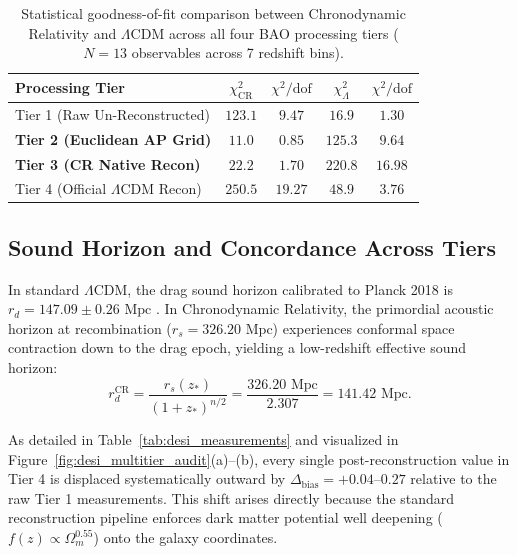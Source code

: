 \documentclass[aps,prd,reprint,superscriptaddress,nofootinbib,floatfix,amsmath,amssymb]{revtex4-2}
\begin{document}
\begin{table}[b]
\caption{\label{tab:tier_summary}Statistical goodness-of-fit comparison between Chronodynamic Relativity and $\Lambda\text{CDM}$ across all four BAO processing tiers ($N = 13$ observables across 7 redshift bins).}
\begin{ruledtabular}
\begin{tabular}{lcccc}
Processing Tier & $\chi^2_{\text{CR}}$ & $\chi^2/\text{dof}$ & $\chi^2_{\Lambda}$ & $\chi^2/\text{dof}$ \\
\midrule
Tier 1 (Raw Un-Reconstructed) & $123.1$ & $9.47$ & $16.9$ & $1.30$ \\
\textbf{Tier 2 (Euclidean AP Grid)} & $\mathbf{11.0}$ & $\mathbf{0.85}$ & $125.3$ & $9.64$ \\
\textbf{Tier 3 (CR Native Recon)} & $\mathbf{22.2}$ & $\mathbf{1.70}$ & $220.8$ & $16.98$ \\
Tier 4 (Official $\Lambda\text{CDM}$ Recon) & $250.5$ & $19.27$ & $48.9$ & $3.76$ \\
\end{tabular}
\end{ruledtabular}
\end{table}

\subsection{Sound Horizon and Concordance Across Tiers}

In standard $\Lambda\text{CDM}$, the drag sound horizon calibrated to Planck 2018 is $r_d = 147.09 \pm 0.26\text{ Mpc}$ \cite{Planck2018_Cosmology}. In Chronodynamic Relativity, the primordial acoustic horizon at recombination ($r_s = 326.20\text{ Mpc}$) experiences conformal space contraction down to the drag epoch, yielding a low-redshift effective sound horizon:
\begin{equation}
r_d^{\text{CR}} = \frac{r_s(z_*)}{(1+z_*)^{n/2}} = \frac{326.20\text{ Mpc}}{2.307} = 141.42\text{ Mpc}.
\label{eq:rd_cr}
\end{equation}

As detailed in Table~\ref{tab:desi_measurements} and visualized in Figure~\ref{fig:desi_multitier_audit}(a)--(b), every single post-reconstruction value in Tier 4 is displaced systematically outward by $\Delta_{\text{bias}} = +0.04\text{--}0.27$ relative to the raw Tier 1 measurements. This shift arises directly because the standard reconstruction pipeline enforces dark matter potential well deepening ($f(z) \propto \Omega_m^{0.55}$) onto the galaxy coordinates.
\end{document}
